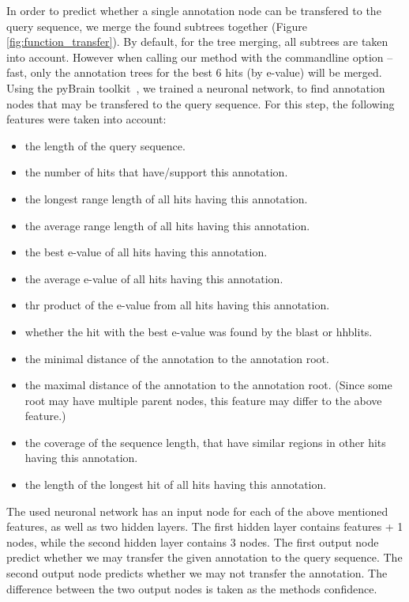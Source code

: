 In order to predict whether a single annotation node can be transfered to the query sequence, we merge the found subtrees together (Figure \ref{fig:function_transfer}). By default, for the tree merging,
all subtrees are taken into account. However when calling our method with the commandline option --fast, only the annotation trees for the best 6 hits (by e-value) will be merged.\newline
Using the pyBrain toolkit~\citep{schaul2010}, we trained a neuronal network, to find annotation nodes that may be transfered to the query sequence. For this step, the following features were taken into
account:
\begin{itemize}
\item the length of the query sequence.
\item the number of hits that have/support this annotation.
\item the longest range length of all hits having this annotation.
\item the average range length of all hits having this annotation.
\item the best e-value of all hits having this annotation.
\item the average e-value of all hits having this annotation.
\item thr product of the e-value from all hits having this annotation.
\item whether the hit with the best e-value was found by the blast or hhblits.
\item the minimal distance of the annotation to the annotation root.
\item the maximal distance of the annotation to the annotation root. (Since some root may have multiple parent nodes, this feature may differ to the above feature.)
\item the coverage of the sequence length, that have similar regions in other hits having this annotation.
\item the length of the longest hit of all hits having this annotation.
\end{itemize}
The used neuronal network has an input node for each of the above mentioned features, as well as two hidden layers. The first hidden layer contains features + 1 nodes, while the second hidden layer
contains 3 nodes. The first output node predict whether we may transfer the given annotation to the query sequence. The second output node predicts whether we may not transfer the annotation.
The difference between the two output nodes is taken as the methods confidence.

